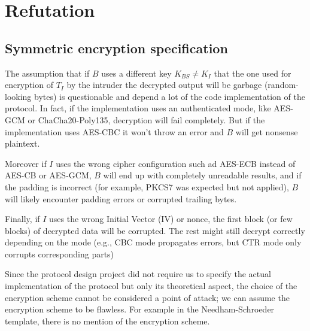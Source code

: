 \documentclass[11pt]{article}
\begin{document}
    \section{Refutation}
        \subsection{Symmetric encryption specification}



            The assumption that if $B$ uses a different key $K_{BS} \neq K_I$ that the one used for encryption of $T_I$ by the
            intruder the decrypted output will be garbage (random-looking bytes) is questionable and depend a lot of
            the code implementation of the protocol. In fact, if the implementation uses an authenticated mode,
            like AES-GCM or ChaCha20-Poly135, decryption will fail completely. But if the implementation uses AES-CBC
            it won't throw an error and $B$ will get nonsense plaintext.

            \vspace{0.5cm}

            Moreover if $I$ uses the wrong cipher configuration such ad AES-ECB instead of AES-CB or AES-GCM, $B$ will
            end up with completely unreadable results, and if the padding is incorrect (for example, PKCS7 was expected
            but not applied), $B$ will likely encounter padding errors or corrupted trailing bytes.

            \vspace{0.5cm}

            Finally, if $I$ uses the wrong Initial Vector (IV) or nonce, the first block (or few blocks) of
            decrypted data will be corrupted. The rest might still decrypt correctly depending on the mode (e.g., CBC
            mode propagates errors, but CTR mode only corrupts corresponding parts)



            \vspace{0.5cm}

            Since the protocol design project did not require us to specify the actual implementation of the protocol
            but only its theoretical aspect, the choice of the encryption scheme cannot be considered a point of attack;
            we can assume the encryption scheme to be flawless. For example in the Needham-Schroeder template, there is
            no mention of the encryption scheme.
\end{document}
